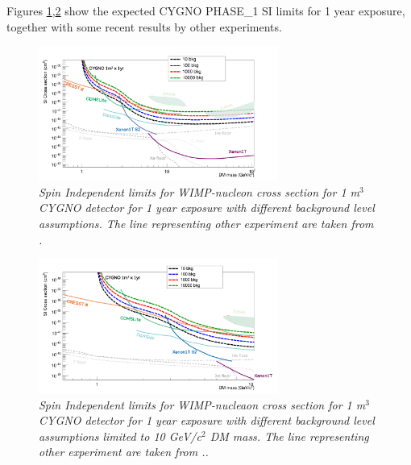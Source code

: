 \documentclass[physics,article,submit,moreauthors,pdftex]{Definitions/mdpi}
\begin{document}
Figures \ref{fig:SI},\ref{fig:SI_zoom} show the expected CYGNO PHASE\_1 SI limits for 1 year exposure, together with some recent results by other experiments.
\begin{figure}[!t]
\centering
 \includegraphics[width=0.7\textwidth]{1m3_1y_4.pdf}
 \caption{\textit{Spin Independent limits for WIMP-nucleon cross section for 1 m$^3$ CYGNO detector for 1 year exposure with different background level assumptions. The line representing other experiment are taken from \cite{bib:Aprile_2018,bib:Aprile_2019,bib:B_hm_2019,bib:Agnes_2018,bib:Agnese_2018,bib:Mancuso:2020gnm,bib:Savage_2009}.}}
 \label{fig:SI}
 \end{figure}
 \begin{figure}[t!]
\centering
 \includegraphics[width=0.7\textwidth]{1m3_1y_4_zoom.pdf}
 \caption{\textit{Spin Independent limits for WIMP-nucleaon cross section for 1 m$^3$ CYGNO detector for 1 year exposure with different background level assumptions limited to 10 GeV/c$^2$ DM mass. The line representing other experiment are taken from \cite{bib:Aprile_2018,bib:Aprile_2019,bib:B_hm_2019,bib:Agnes_2018,bib:Agnese_2018,bib:Mancuso:2020gnm,bib:Savage_2009}..}}
 \label{fig:SI_zoom}
 \end{figure}
\end{document}

